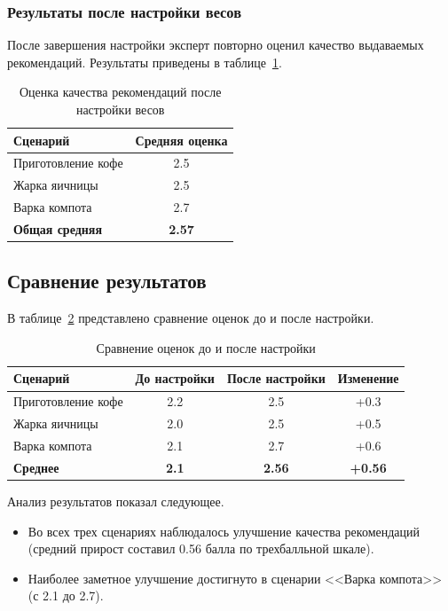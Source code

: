 \subsubsection*{Результаты после настройки весов}

После завершения настройки эксперт повторно оценил качество выдаваемых рекомендаций. Результаты приведены в таблице~\ref{tab:after_tuning}.

\begin{table}[H]
\centering
\caption{Оценка качества рекомендаций после настройки весов}
\label{tab:after_tuning}
\begin{tabular}{|l|c|}
\hline
\textbf{Сценарий} & \textbf{Средняя оценка} \\
\hline
Приготовление кофе & 2.5 \\
\hline
Жарка яичницы & 2.5 \\
\hline
Варка компота & 2.7 \\
\hline
\textbf{Общая средняя} & \textbf{2.57} \\
\hline
\end{tabular}
\end{table}

\subsection{Сравнение результатов}
В таблице~\ref{tab:comparison} представлено сравнение оценок до и после настройки.
\begin{table}[H]
\centering
\caption{Сравнение оценок до и после настройки}
\label{tab:comparison}
\begin{tabular}{|l|c|c|c|}
\hline
\textbf{Сценарий} & \textbf{До настройки} & \textbf{После настройки} & \textbf{Изменение} \\
\hline
Приготовление кофе & 2.2 & 2.5 & +0.3 \\
\hline
Жарка яичницы & 2.0 & 2.5 & +0.5 \\
\hline
Варка компота & 2.1 & 2.7 & +0.6 \\
\hline
\textbf{Среднее} & \textbf{2.1} & \textbf{2.56} & \textbf{+0.56} \\
\hline
\end{tabular}
\end{table}

Анализ результатов показал следующее.
\begin{itemize}
\item Во всех трех сценариях наблюдалось улучшение качества рекомендаций (средний прирост составил 0.56 балла по трехбалльной шкале).
\item Наиболее заметное улучшение достигнуто в сценарии <<Варка компота>> (с 2.1 до 2.7).
\end{itemize}

